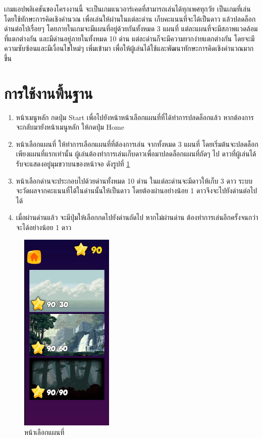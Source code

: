 เกมแอปพลิเคชันของโครงงานนี้ จะเป็นเกมแนวอาร์เคดที่สามารถเล่นได้ทุกเพศทุกวัย 
เป็นเกมที่เล่นโดยใช้ทักษะการคิดเชิงคำนวณ เพื่อเล่นให้ผ่านในแต่ละด่าน เก็บคะแนนที่จะได้เป็นดาว แล้วปลดล็อกด่านต่อไปเรื่อยๆ 
โดยภายในเกมจะมีแผนที่อยู่ด้วยกันทั้งหมด 3 แผนที่ แต่ละแผนที่จะมีสภาพแวดล้อมที่แตกต่างกัน และมีด่านอยู่ภายในทั้งหมด 10 
ด่าน แต่ละด่านก็จะมีความยากง่ายแตกต่างกัน โดยจะมีความซับซ้อนและมีเงื่อนไขใหม่ๆ
เพิ่มเข้ามา เพื่อให้ผู้เล่นได้ใช้และพัฒนาทักษะการคิดเชิงคำนวณมากขึ้น

\section{การใช้งานพื้นฐาน}
\begin{enumerate}
    \item หน้าเมนูหลัก กดปุ่ม Start เพื่อไปยังหน้าหน้าเลือกแผนที่ที่ได้ทำการปลดล็อกแล้ว หากต้องการจะกลับมายังหน้าเมนูหลัก ให้กดปุ่ม Home
    \item หน้าเลือกแผนที่ ให้ทำการเลือกแผนที่ที่ต้องการเล่น จากทั้งหมด 3 แผนที่ โดยเริ่มต้นจะปลดล็อกเพียงแผนที่แรกเท่านั้น ผู้เล่นต้องทำการเล่นเก็บดาวเพื่อมาปลดล็อกแผนที่ถัดๆ ไป ดาวที่ผู้เล่นได้รับจะแสดงอยู่มุมขวาบนของหน้าจอ ดังรูปที่ \ref{mapselection}
    \item หน้าเลือกด่านจะประกอบไปด้วยด่านทั้งหมด 10 ด่าน ในแต่ละด่านจะมีดาวให้เก็บ 3 ดาว ระบบจะวัดผลจากคะแนนที่ได้ในด่านนั้นให้เป็นดาว โดยต้องผ่านอย่างน้อย 1 ดาวจึงจะไปยังด่านต่อไปได้
    \item เมื่อผ่านด่านแล้ว จะมีปุ่มให้เลือกกดไปยังด่านถัดไป หากไม่ผ่านด่าน ต้องทำการเล่นอีกครั้งจนกว่าจะได้อย่างน้อย 1 ดาว
\end{enumerate}

\begin{figure}[h!]
    \begin{center}
    \includegraphics[width=1.75in]{pic/MapSelection.png}
    \end{center}
    \caption[หน้าเลือกแผนที่]{หน้าเลือกแผนที่}
    \label{mapselection}
    \end{figure}

